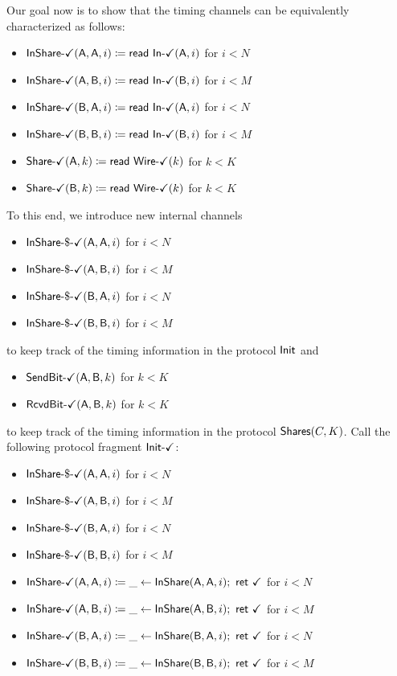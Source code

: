 \noindent Our goal now is to show that the timing channels can be equivalently characterized as follows:
\begin{itemize}
\item {\color{teal} $\InShareOk(\A,\A,i) \coloneqq \read{\InOk(\A,i)}$ for $i < N$}
\item {\color{teal} $\InShareOk(\A,\B,i) \coloneqq \read{\InOk(\B,i)}$ for $i < M$}
\item {\color{teal} $\InShareOk(\B,\A,i) \coloneqq \read{\InOk(\A,i)}$ for $i < N$}
\item {\color{teal} $\InShareOk(\B,\B,i) \coloneqq \read{\InOk(\B,i)}$ for $i < M$}
\item {\color{teal} $\ShareOk(\A,k) \coloneqq \read{\WireOk(k)}$ for $k < K$}
\item {\color{teal} $\ShareOk(\B,k) \coloneqq \read{\WireOk(k)}$ for $k < K$}
\end{itemize}
To this end, we introduce new internal channels
\begin{itemize}
\item {\color{teal} $\InShareGenOk(\A,\A,i)$ for $i < N$}
\item {\color{teal} $\InShareGenOk(\A,\B,i)$ for $i < M$}
\item {\color{teal} $\InShareGenOk(\B,\A,i)$ for $i < N$}
\item {\color{teal} $\InShareGenOk(\B,\B,i)$ for $i < M$}
\end{itemize}
to keep track of the timing information in the protocol $\Init$ and
\begin{itemize}
\item {\color{teal} $\SendBitOk(\A,\B,k)$ for $k < K$}
\item {\color{teal} $\RcvdBitOk(\A,\B,k)$ for $k < K$}
\end{itemize}
to keep track of the timing information in the protocol $\Shares(C,K)$. Call the following protocol fragment $\InitOk$:
\begin{itemize}
\item {\color{teal} $\InShareGenOk(\A,\A,i)$ for $i < N$}
\item {\color{teal} $\InShareGenOk(\A,\B,i)$ for $i < M$}
\item {\color{teal} $\InShareGenOk(\B,\A,i)$ for $i < N$}
\item {\color{teal} $\InShareGenOk(\B,\B,i)$ for $i < M$}
\item {\color{teal} $\InShareOk(\A,\A,i) \coloneqq \_ \leftarrow \InShare(\A,\A,i); \ \ret{\checkmark}$ for $i < N$}
\item {\color{teal} $\InShareOk(\A,\B,i) \coloneqq \_ \leftarrow \InShare(\A,\B,i); \ \ret{\checkmark}$ for $i < M$}
\item {\color{teal} $\InShareOk(\B,\A,i) \coloneqq \_ \leftarrow \InShare(\B,\A,i); \ \ret{\checkmark}$ for $i < N$}
\item {\color{teal} $\InShareOk(\B,\B,i) \coloneqq \_ \leftarrow \InShare(\B,\B,i); \ \ret{\checkmark}$ for $i < M$}
\end{itemize}
